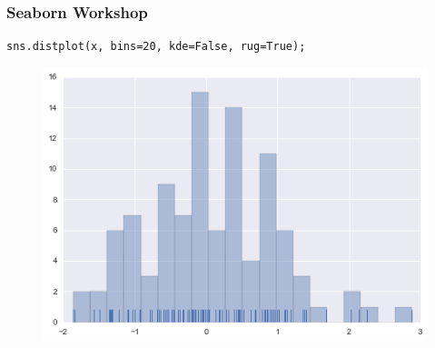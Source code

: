 \documentclass{beamer}
\begin{document}
\begin{frame}[fragile]
		\frametitle{Seaborn Workshop}
		\large
\begin{verbatim}
sns.distplot(x, bins=20, kde=False, rug=True);
\end{verbatim}

\begin{figure}
	\centering
	\includegraphics[width=0.7\linewidth]{images/distributions_12_0}
\end{figure}
\end{frame}
\end{document}
